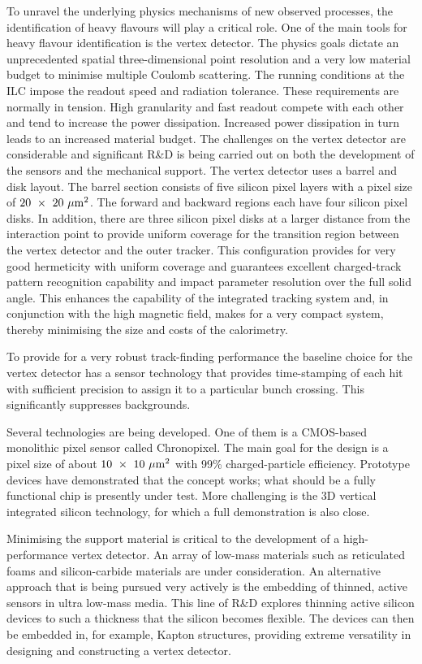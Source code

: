 To unravel the underlying physics mechanisms of new observed processes, the
identification of heavy flavours will play a critical role. One of the main
tools for heavy flavour identification is the vertex detector. The physics goals
dictate an unprecedented spatial three-dimensional point resolution and a very
low material budget to minimise multiple Coulomb scattering. The running 
conditions at the ILC impose the readout speed and radiation tolerance. 
These requirements are normally in tension. High
granularity and fast readout compete with each other and tend to increase the
power dissipation. Increased power dissipation in turn leads to an increased
material budget. The challenges on the vertex detector are considerable and
significant R\&D is being carried out on both the development of the sensors and
the mechanical support.
The \sid vertex detector uses a barrel and disk layout. The barrel section
consists of five silicon pixel layers with a pixel size of
$20~\times~20~\mu\mathrm{m}^2$. The forward and backward regions each have four
silicon pixel disks. In addition, there are three silicon pixel disks at a
larger distance from the interaction point to provide uniform coverage for the
transition region between the vertex detector and the outer tracker. This
configuration provides for very good hermeticity with uniform coverage and
guarantees excellent charged-track pattern recognition capability and impact parameter resolution 
over the full solid angle. 
This enhances the capability of the integrated tracking system and, 
in conjunction with the high magnetic field, makes for a very compact
system, thereby minimising the size and costs of the calorimetry.

To provide for a very robust track-finding performance the baseline 
choice for the vertex detector has a sensor technology that provides
time-stamping of each hit with sufficient precision to assign it to
a particular bunch crossing. This significantly suppresses
backgrounds. 

Several technologies are being developed. One of them is a CMOS-based
monolithic pixel sensor called Chronopixel. The main goal for the design is a
pixel size of about $10~\times~10~\mu\mathrm{m}^2$ with 99\% charged-particle
 efficiency. Prototype devices have demonstrated that the concept works; 
what should be a fully functional chip is presently under test. More 
challenging is the 3D vertical integrated silicon technology, for which a full 
demonstration is also close.

Minimising the support material is critical to the development of a high-performance 
vertex detector. An array of 
low-mass materials such as reticulated foams and silicon-carbide
materials are under consideration. An alternative approach that is being pursued very actively is the
embedding of thinned, active sensors in ultra low-mass media. This line of R\&D
explores thinning active silicon devices to such a thickness that the silicon
becomes flexible. The devices can then be embedded in, for example, Kapton
structures, providing extreme versatility in designing and constructing a vertex
detector.

